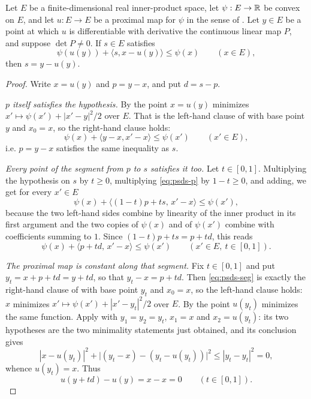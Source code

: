 \begin{lemma}
Let $E$ be a finite-dimensional real inner-product space, let $\psi:E\to\mathbb{R}$ be
convex on $E$, and let $u:E\to E$ be a proximal map for $\psi$ in the sense of
. Let $y\in E$ be a point at which $u$ is differentiable
with derivative the continuous linear map $P$, and suppose $\det P\ne0$. If
$s\in E$ satisfies
\[
  \psi(u(y))+\langle s,x-u(y)\rangle\le\psi(x)\qquad(x\in E),
\]
then $s=y-u(y)$.
\end{lemma}
\begin{proof}
Write $x=u(y)$ and $p=y-x$, and put $d=s-p$.

\emph{$p$ itself satisfies the hypothesis.}
By  the point $x=u(y)$ minimizes
$x'\mapsto\psi(x')+|x'-y|^2/2$ over $E$. That is the left-hand clause of
 with base point $y$ and $x_0=x$, so the
right-hand clause holds:
\begin{equation}\label{eq:psds-p}
  \psi(x)+\langle y-x,x'-x\rangle\le\psi(x')\qquad(x'\in E),
\end{equation}
i.e. $p=y-x$ satisfies the same inequality as $s$.

\emph{Every point of the segment from $p$ to $s$ satisfies it too.}
Let $t\in[0,1]$. Multiplying the hypothesis on $s$ by $t\ge0$, multiplying
\eqref{eq:psds-p} by $1-t\ge0$, and adding, we get for every $x'\in E$
\[
  \psi(x)+\langle (1-t)p+ts,\,x'-x\rangle\le\psi(x'),
\]
because the two left-hand sides combine by linearity of the inner product in its
first argument and the two copies of $\psi(x)$ and of $\psi(x')$ combine with
coefficients summing to $1$. Since $(1-t)p+ts=p+td$, this reads
\begin{equation}\label{eq:psds-seg}
  \psi(x)+\langle p+td,\,x'-x\rangle\le\psi(x')\qquad(x'\in E,\ t\in[0,1]).
\end{equation}

\emph{The proximal map is constant along that segment.}
Fix $t\in[0,1]$ and put $y_t=x+p+td=y+td$, so that $y_t-x=p+td$. Then
\eqref{eq:psds-seg} is exactly the right-hand clause of
 with base point $y_t$ and $x_0=x$, so the
left-hand clause holds: $x$ minimizes $x'\mapsto\psi(x')+|x'-y_t|^2/2$ over $E$.
By  the point $u(y_t)$ minimizes the same function. Apply
 with $y_1=y_2=y_t$, $x_1=x$ and $x_2=u(y_t)$: its
two hypotheses are the two minimality statements just obtained, and its
conclusion gives
\[
  |x-u(y_t)|^2+\bigl|(y_t-x)-(y_t-u(y_t))\bigr|^2\le|y_t-y_t|^2=0 ,
\]
whence $u(y_t)=x$. Thus
\begin{equation}\label{eq:psds-const}
  u(y+td)-u(y)=x-x=0\qquad(t\in[0,1]).
\end{equation}


\end{proof}

